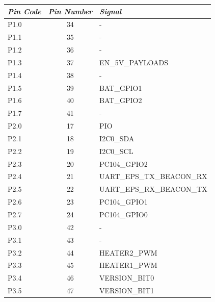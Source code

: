 \begin{longtable}{lcl}
    \toprule[1.5pt]
    \textit{Pin Code} & \textit{Pin Number} & \textit{Signal}       \\
    \midrule
    P1.0              & 34                  & -                 \\
    P1.1              & 35                  & -                 \\
    P1.2              & 36                  & -                 \\
    P1.3              & 37                  & EN\_5V\_PAYLOADS  \\
    P1.4              & 38                  & -             \\
    P1.5              & 39                  & BAT\_GPIO1    \\
    P1.6              & 40                  & BAT\_GPIO2    \\
    P1.7              & 41                  & -             \\
    \midrule
    P2.0              & 17                  & PIO           \\
    P2.1              & 18                  & I2C0\_SDA     \\
    P2.2              & 19                  & I2C0\_SCL     \\
    P2.3              & 20                  & PC104\_GPIO2  \\
    P2.4              & 21                  & UART\_EPS\_TX\_BEACON\_RX     \\
    P2.5              & 22                  & UART\_EPS\_RX\_BEACON\_TX     \\
    P2.6              & 23                  & PC104\_GPIO1                  \\            
    P2.7              & 24                  & PC104\_GPIO0                   \\
    \midrule
    P3.0              & 42                  & -                     \\
    P3.1              & 43                  & -                     \\
    P3.2              & 44                  & HEATER2\_PWM          \\
    P3.3              & 45                  & HEATER1\_PWM          \\
    P3.4              & 46                  & VERSION\_BIT0         \\
    P3.5              & 47                  & VERSION\_BIT1         \\

\end{longtable}
